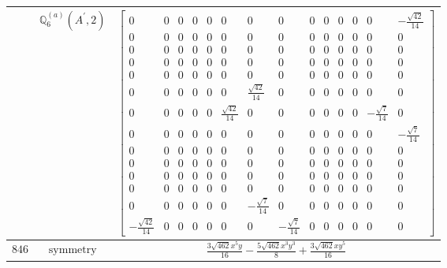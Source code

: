 \documentclass[fleqn,8pt,landscape]{jsarticle}
\begin{document}
\begin{longtable}{ccc}
$  $ & $ \mathbb{Q}_{6}^{(a)}(A^{\prime},2) $ & $ \begin{bmatrix} 0 & 0 & 0 & 0 & 0 & 0 & 0 & 0 & 0 & 0 & 0 & 0 & 0 & - \frac{\sqrt{42}}{14} \\ 0 & 0 & 0 & 0 & 0 & 0 & 0 & 0 & 0 & 0 & 0 & 0 & 0 & 0 \\ 0 & 0 & 0 & 0 & 0 & 0 & 0 & 0 & 0 & 0 & 0 & 0 & 0 & 0 \\ 0 & 0 & 0 & 0 & 0 & 0 & 0 & 0 & 0 & 0 & 0 & 0 & 0 & 0 \\ 0 & 0 & 0 & 0 & 0 & 0 & 0 & 0 & 0 & 0 & 0 & 0 & 0 & 0 \\ 0 & 0 & 0 & 0 & 0 & 0 & \frac{\sqrt{42}}{14} & 0 & 0 & 0 & 0 & 0 & 0 & 0 \\ 0 & 0 & 0 & 0 & 0 & \frac{\sqrt{42}}{14} & 0 & 0 & 0 & 0 & 0 & 0 & - \frac{\sqrt{7}}{14} & 0 \\ 0 & 0 & 0 & 0 & 0 & 0 & 0 & 0 & 0 & 0 & 0 & 0 & 0 & - \frac{\sqrt{7}}{14} \\ 0 & 0 & 0 & 0 & 0 & 0 & 0 & 0 & 0 & 0 & 0 & 0 & 0 & 0 \\ 0 & 0 & 0 & 0 & 0 & 0 & 0 & 0 & 0 & 0 & 0 & 0 & 0 & 0 \\ 0 & 0 & 0 & 0 & 0 & 0 & 0 & 0 & 0 & 0 & 0 & 0 & 0 & 0 \\ 0 & 0 & 0 & 0 & 0 & 0 & 0 & 0 & 0 & 0 & 0 & 0 & 0 & 0 \\ 0 & 0 & 0 & 0 & 0 & 0 & - \frac{\sqrt{7}}{14} & 0 & 0 & 0 & 0 & 0 & 0 & 0 \\ - \frac{\sqrt{42}}{14} & 0 & 0 & 0 & 0 & 0 & 0 & - \frac{\sqrt{7}}{14} & 0 & 0 & 0 & 0 & 0 & 0 \end{bmatrix} $ \\ \hline
$ 846 $ & $ \text{symmetry} $ & $ \frac{3 \sqrt{462} x^{5} y}{16} - \frac{5 \sqrt{462} x^{3} y^{3}}{8} + \frac{3 \sqrt{462} x y^{5}}{16} $ \\

\end{longtable}
\end{document}
